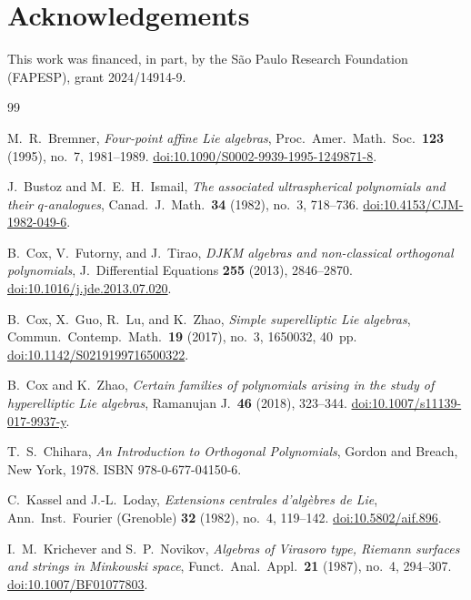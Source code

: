 \documentclass[11pt]{amsart}
\theoremstyle{definition}
\theoremstyle{remark}
\begin{document}
\section*{Acknowledgements}
This work was financed, in part, by the S\~ao Paulo Research Foundation (FAPESP), grant 2024/14914-9.

\begin{thebibliography}{99}

M.~R.~Bremner,
\emph{Four-point affine Lie algebras},
Proc.\ Amer.\ Math.\ Soc.\ \textbf{123} (1995), no.~7, 1981--1989.
\href{https://doi.org/10.1090/S0002-9939-1995-1249871-8}{doi:10.1090/S0002-9939-1995-1249871-8}.

J.~Bustoz and M.~E.~H.~Ismail,
\emph{The associated ultraspherical polynomials and their $q$-analogues},
Canad.\ J.\ Math.\ \textbf{34} (1982), no.~3, 718--736.
\href{https://doi.org/10.4153/CJM-1982-049-6}{doi:10.4153/CJM-1982-049-6}.

B.~Cox, V.~Futorny, and J.~Tirao,
\emph{DJKM algebras and non-classical orthogonal polynomials},
J.~Differential Equations \textbf{255} (2013), 2846--2870.
\href{https://doi.org/10.1016/j.jde.2013.07.020}{doi:10.1016/j.jde.2013.07.020}.

B.~Cox, X.~Guo, R.~Lu, and K.~Zhao,
\emph{Simple superelliptic Lie algebras},
Commun.\ Contemp.\ Math.\ \textbf{19} (2017), no.~3, 1650032, 40~pp.
\href{https://doi.org/10.1142/S0219199716500322}{doi:10.1142/S0219199716500322}.

B.~Cox and K.~Zhao,
\emph{Certain families of polynomials arising in the study of hyperelliptic
Lie algebras},
Ramanujan J.\ \textbf{46} (2018), 323--344.
\href{https://doi.org/10.1007/s11139-017-9937-y}{doi:10.1007/s11139-017-9937-y}.

T.~S.~Chihara,
\emph{An Introduction to Orthogonal Polynomials},
Gordon and Breach, New York, 1978.
ISBN 978-0-677-04150-6.

C.~Kassel and J.-L.~Loday,
\emph{Extensions centrales d'alg\`ebres de Lie},
Ann.\ Inst.\ Fourier (Grenoble) \textbf{32} (1982), no.~4, 119--142.
\href{https://doi.org/10.5802/aif.896}{doi:10.5802/aif.896}.

I.~M.~Krichever and S.~P.~Novikov,
\emph{Algebras of Virasoro type, Riemann surfaces and strings in Minkowski space},
Funct.\ Anal.\ Appl.\ \textbf{21} (1987), no.~4, 294--307.
\href{https://doi.org/10.1007/BF01077803}{doi:10.1007/BF01077803}.


\end{thebibliography}
\end{document}
